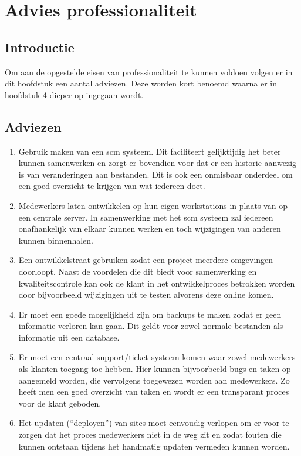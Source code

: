\chapter{Advies professionaliteit}

\section{Introductie}



Om aan de opgestelde eisen van professionaliteit te kunnen voldoen volgen er in dit hoofdstuk een aantal adviezen. Deze worden kort benoemd waarna er in hoofdstuk 4 dieper op ingegaan wordt.

\section{Adviezen}

\begin{enumerate}
  \item Gebruik maken van een {\sc scm} systeem. Dit faciliteert gelijktijdig het beter kunnen samenwerken en zorgt er bovendien voor dat er een historie aanwezig is van veranderingen aan bestanden. Dit is ook een onmisbaar onderdeel om een goed overzicht te krijgen van wat iedereen doet.
  \item Medewerkers laten ontwikkelen op hun eigen workstations in plaats van op een centrale server. In samenwerking met het {\sc scm} systeem zal iedereen onafhankelijk van elkaar kunnen werken en toch wijzigingen van anderen kunnen binnenhalen.
  \item Een ontwikkelstraat gebruiken zodat een project meerdere omgevingen doorloopt. Naast de voordelen die dit biedt voor samenwerking en kwaliteitscontrole kan ook de klant in het ontwikkelproces betrokken worden door bijvoorbeeld wijzigingen uit te testen alvorens deze online komen.
  \item Er moet een goede mogelijkheid zijn om backups te maken zodat er geen informatie verloren kan gaan. Dit geldt voor zowel normale bestanden als informatie uit een database.
  \item Er moet een centraal support/ticket systeem komen waar zowel medewerkers als klanten toegang toe hebben. Hier kunnen bijvoorbeeld bugs en taken op aangemeld worden, die vervolgens toegewezen worden aan medewerkers. Zo heeft men een goed overzicht van taken en wordt er een transparant proces voor de klant geboden.
  \item Het updaten (``deployen'') van sites moet eenvoudig verlopen om er voor te zorgen dat het proces medewerkers niet in de weg zit en zodat fouten die kunnen ontstaan tijdens het handmatig updaten vermeden kunnen worden.
  
\end{enumerate}
